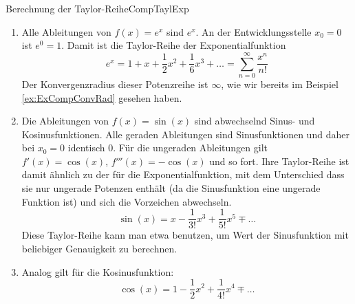 \begin{example}{Berechnung der Taylor-Reihe}{CompTaylExp}
    \begin{enumerate}
        \item Alle Ableitungen von $f(x)=e^x$ sind $e^x$. An der Entwicklungsstelle $x_0=0$ ist $e^0 = 1$. Damit ist die Taylor-Reihe der Exponentialfunktion
        \begin{equation}
            e^x = 1 + x + \frac{1}{2} x^2 + \frac{1}{6}x^3 + \dots = \sum\limits_{n=0}^\infty \frac{x^n}{n!}
        \end{equation}
        Der Konvergenzradius dieser Potenzreihe ist $\infty$, wie wir bereits im Beispiel \ref{ex:ExCompConvRad} gesehen haben.
        \item Die Ableitungen von $f(x) =\sin(x)$ sind abwechselnd Sinus- und Kosinusfunktionen. Alle geraden Ableitungen sind Sinusfunktionen und daher bei $x_0=0$ identisch $0$. Für die ungeraden Ableitungen gilt $f'(x) = \cos(x)$, $f'''(x) = -\cos(x)$ und so fort. Ihre Taylor-Reihe ist damit ähnlich zu der für die Exponentialfunktion, mit dem Unterschied dass sie nur ungerade Potenzen enthält (da die Sinusfunktion eine ungerade Funktion ist) und sich die Vorzeichen abwechseln.
        \begin{equation}
            \sin(x) = x - \frac{1}{3!}x^3 + \frac{1}{5!} x^5 \mp \dots
        \end{equation}
        Diese Taylor-Reihe kann man etwa benutzen, um Wert der Sinusfunktion mit beliebiger Genauigkeit zu berechnen.
        \item Analog gilt für die Kosinusfunktion:
        \begin{equation}
            \cos(x) = 1 - \frac{1}{2}x^2 + \frac{1}{4!} x^4 \mp \dots
        \end{equation}
    \end{enumerate}
\end{example}

